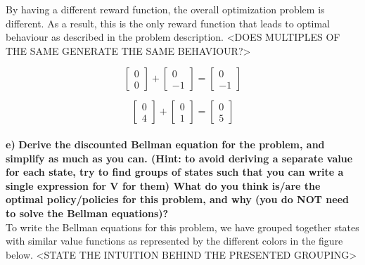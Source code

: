 \documentclass[11pt]{article}
\begin{document}
\noindent
By having a different reward function, the overall optimization problem is different.
As a result, this is the only reward function that leads to optimal
behaviour as described in the problem description. <DOES MULTIPLES OF THE SAME GENERATE THE SAME BEHAVIOUR?>

\begin{equation}
\left[\begin{array}{c}
{0} \\
{0}
\end{array}\right]+\left[\begin{array}{c}
{0} \\
{-1}
\end{array}\right]=\left[\begin{array}{c}
{0} \\
{-1}
\end{array}\right]
\end{equation}

\begin{equation}
\left[\begin{array}{l}
{0} \\
{4}
\end{array}\right]+\left[\begin{array}{l}
{0} \\
{1}
\end{array}\right]=\left[\begin{array}{l}
{0} \\
{5}
\end{array}\right]
\end{equation}
\\

\noindent
\textbf{e)}
\noindent
\textbf{Derive the discounted Bellman equation for the problem, and simplify
as much as you can. (Hint: to avoid deriving a separate value for each state,
try to find groups of states such that you can write a single expression for V for
them) What do you think is/are the optimal policy/policies for this problem,
and why (you do NOT need to solve the Bellman equations)?}
\\



\noindent
To write the Bellman equations for this problem, we have grouped together states
with similar value functions as represented by the different colors in the figure below.
<STATE THE INTUITION BEHIND THE PRESENTED GROUPING>
\\
\end{document}
